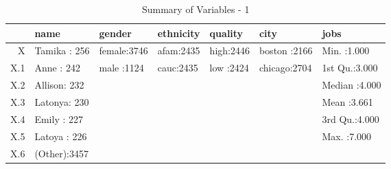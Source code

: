 \begin{table}[ht]
\centering
\begin{tabular}{rllllll}
  \hline
 &      name &    gender & ethnicity & quality &      city &      jobs \\ 
  \hline
X & Tamika : 256   & female:3746   & afam:2435   & high:2446   & boston :2166   & Min.   :1.000   \\ 
  X.1 & Anne   : 242   & male  :1124   & cauc:2435   & low :2424   & chicago:2704   & 1st Qu.:3.000   \\ 
  X.2 & Allison: 232   &  &  &  &  & Median :4.000   \\ 
  X.3 & Latonya: 230   &  &  &  &  & Mean   :3.661   \\ 
  X.4 & Emily  : 227   &  &  &  &  & 3rd Qu.:4.000   \\ 
  X.5 & Latoya : 226   &  &  &  &  & Max.   :7.000   \\ 
  X.6 & (Other):3457   &  &  &  &  &  \\ 
   \hline
\end{tabular}
\caption{Summary of Variables - 1} 
\label{tab:summary1}
\end{table}
